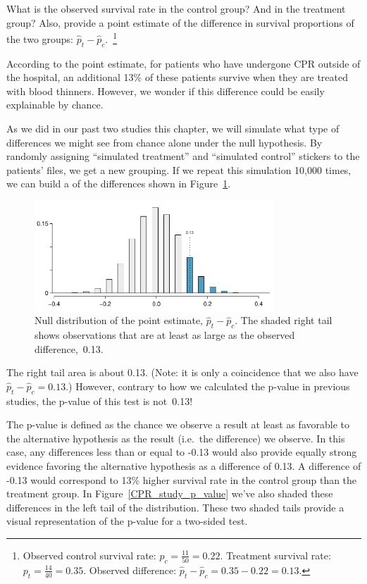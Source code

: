 \begin{exercise}
What is the observed survival rate in the control group? And in the treatment group? Also, provide a point estimate of the difference in survival proportions of the two groups: $\hat{p}_t - \hat{p}_c$.~\footnote{Observed control survival rate: $p_c = \frac{11}{50} = 0.22$. Treatment survival rate: $p_t = \frac{14}{40} = 0.35$. Observed difference: $\hat{p}_t - \hat{p}_c = 0.35 - 0.22 = 0.13$.}
\end{exercise}

According to the point estimate, for patients who have undergone CPR outside of the hospital, an additional 13\% of these patients survive when they are treated with blood thinners. However, we wonder if this difference could be easily explainable by chance.

As we did in our past two studies this chapter, we will simulate what type of differences we might see from chance alone under the null hypothesis. By randomly assigning ``simulated treatment'' and ``simulated control'' stickers to the patients' files, we get a new grouping. If we repeat this simulation 10,000 times, we can build a  of the differences shown in Figure~\ref{CPR_study_right_tail}.

\begin{figure}[ht]
\centering
\includegraphics[width=0.8\textwidth]{02/figures/CPR_study/CPR_study_right_tail}
\caption{Null distribution of the point estimate, $\hat{p}_t - \hat{p}_c$. The shaded right tail shows observations that are at least as large as the observed difference,~0.13.}
\label{CPR_study_right_tail}
\end{figure}

The right tail area is about 0.13. (Note: it is only a coincidence that we also have $\hat{p}_t - \hat{p}_c=0.13$.) However, contrary to how we calculated the p-value in previous studies, the p-value of this test is not~0.13!

The p-value is defined as the chance we observe a result at least as favorable to the alternative hypothesis as the result (i.e.~the difference) we observe. In this case, any differences less than or equal to -0.13 would also provide equally strong evidence favoring the alternative hypothesis as a difference of 0.13. A difference of -0.13 would correspond to 13\% higher survival rate in the control group than the treatment group. In Figure~\ref{CPR_study_p_value} we've also shaded these differences in the left tail of the distribution. These two shaded tails provide a visual representation of the p-value for a two-sided test.

